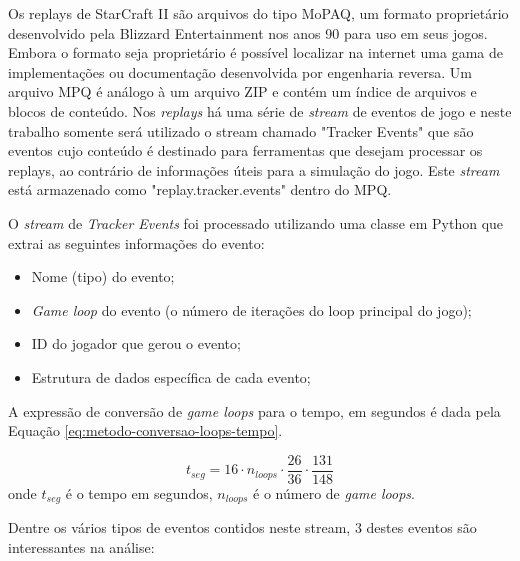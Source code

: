 Os \glspl{replay} de StarCraft II são arquivos do tipo MoPAQ, um formato proprietário desenvolvido pela Blizzard Entertainment nos anos 90 para uso em seus jogos. Embora o formato seja proprietário é possível localizar na internet uma gama de implementações ou documentação desenvolvida por engenharia reversa. Um arquivo MPQ é análogo à um arquivo ZIP e contém um índice de arquivos e blocos de conteúdo. Nos \textit{\glspl{replay}} há uma série de \textit{stream} de eventos de jogo e neste trabalho somente será utilizado o stream chamado "Tracker Events" que são eventos cujo conteúdo é destinado para ferramentas que desejam processar os \glspl{replay}, ao contrário de informações úteis para a simulação do jogo. Este \textit{stream} está armazenado como "replay.tracker.events" dentro do MPQ.

O \textit{stream} de \textit{Tracker Events} foi processado utilizando uma classe em Python que extrai as seguintes informações do evento:

\begin{itemize}
	\item Nome (tipo) do evento;
	\item \textit{Game loop} do evento (o número de iterações do loop principal do jogo);
	\item ID do jogador que gerou o evento;
	\item Estrutura de dados específica de cada evento;
\end{itemize}

A expressão de conversão de \textit{game loops} para o tempo, em segundos é dada pela Equação \ref{eq:metodo-conversao-loops-tempo}.

\begin{equation}
	t_{seg} = 16 \cdot n_{loops} \cdot \frac{26}{36} \cdot \frac{131}{148}
	\label{eq:metodo-conversao-loops-tempo}
\end{equation}
\noindent onde $t_{seg}$ é o tempo em segundos, $n_{loops}$ é o número de \textit{game loops}.

Dentre os vários tipos de eventos contidos neste stream, 3 destes eventos são interessantes na análise:

